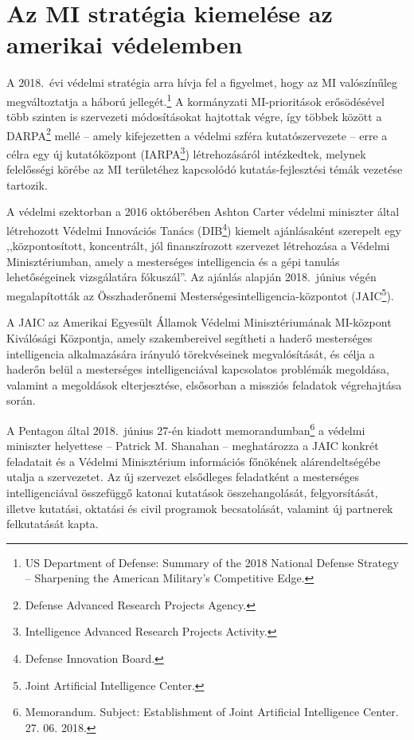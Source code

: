 \documentclass[
]{thesis-ekf}
\theoremstyle{definition}
\theoremstyle{remark}
\begin{document}
	\section{Az MI stratégia kiemelése az amerikai védelemben}
	A 2018.~évi védelmi stratégia arra hívja fel a figyelmet, hogy az MI valószínűleg megváltoztatja a háború jellegét.\footnote{US Department of Defense: Summary of the 2018 National Defense Strategy – Sharpening the American Military’s Competitive Edge.} A kormányzati MI-prioritások erősödésével több szinten is szervezeti módosításokat hajtottak végre, így többek között a DARPA\footnote{Defense Advanced Research Projects Agency.} mellé -- amely kifejezetten a védelmi szféra kutatószervezete -- erre a célra egy új kutatóközpont (IARPA\footnote{Intelligence Advanced Research Projects Activity.}) létrehozásáról intézkedtek, melynek felelősségi körébe az MI területéhez kapcsolódó kutatás-fejlesztési témák vezetése tartozik.
	
	A védelmi szektorban a 2016 októberében Ashton Carter védelmi miniszter által létrehozott Védelmi Innovációs Tanács (DIB\footnote{Defense Innovation Board.}) kiemelt ajánlásaként szerepelt egy ,,központosított, koncentrált, jól finanszírozott szervezet létrehozása a Védelmi Minisztériumban, amely a mesterséges intelligencia és a gépi tanulás lehetőségeinek vizsgálatára fókuszál''. Az ajánlás alapján 2018.~június végén megalapították az Összhaderőnemi Mesterségesintelligencia-központot (JAIC\footnote{Joint Artificial Intelligence Center.}).
	
	A JAIC az Amerikai Egyesült Államok Védelmi Minisztériumának MI-központ Kiválósági Központja, amely szakembereivel segítheti a haderő mesterséges intelligencia alkalmazására irányuló törekvéseinek megvalósítását, és célja a haderőn belül a mesterséges intelligenciával kapcsolatos problémák megoldása, valamint a megoldások elterjesztése, elsősorban a missziós feladatok végrehajtása során.
	
	A Pentagon által 2018.~június 27-én kiadott memorandumban\footnote{Memorandum. Subject: Establishment of Joint Artificial Intelligence Center. 27. 06. 2018.} a védelmi miniszter helyettese -- Patrick M. Shanahan -- meghatározza a JAIC konkrét feladatait és a Védelmi Minisztérium információs főnökének alárendeltségébe utalja a szervezetet. Az új szervezet elsődleges feladatként a mesterséges intelligenciával összefüggő katonai kutatások összehangolását, felgyorsítását, illetve kutatási, oktatási és civil programok becsatolását, valamint új partnerek felkutatását kapta.
	
\end{document}
